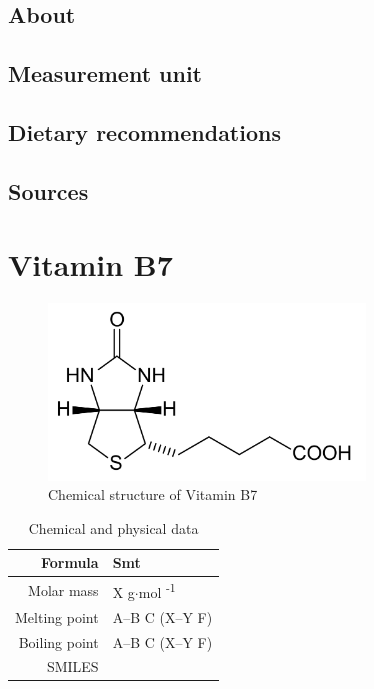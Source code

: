 \documentclass{book}
\begin{document}
\section{About}


\section{Measurement unit}


\section{Dietary recommendations}


\section{Sources}


\chapter{Vitamin B7}
\begin{figure}[h]
	\caption{Chemical structure of Vitamin B7}
	\centering \includegraphics[width=0.75\textwidth]{images/Vitamin_B7_chemical_structure}
\end{figure}

\begin{table}[h]
	\caption{Chemical and physical data}
	\centering \begin{tabular}{| r | l |}
		\hline
		Formula & Smt\\ \hline
		Molar mass & X g$\cdot$mol \textsuperscript{-1}\\ \hline
		Melting point & A--B \degree C (X--Y \degree F)\\ \hline
		Boiling point & A--B \degree C (X--Y \degree F)\\ \hline
		SMILES & \\ \hline
	\end{tabular}
\end{table}
\newpage
\end{document}
